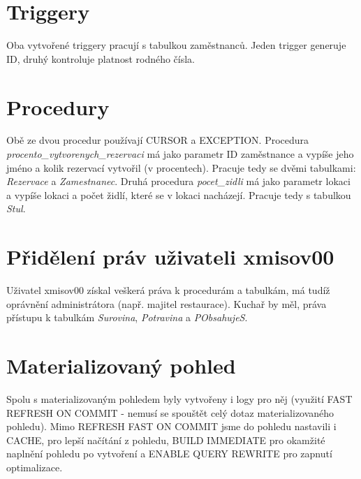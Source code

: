 \documentclass[11pt, a4paper]{article}[]
\begin{document}
    \section{Triggery}
    Oba vytvořené triggery pracují s tabulkou zaměstnanců. Jeden trigger generuje
    ID, druhý kontroluje platnost rodného čísla.

    \section{Procedury}
    Obě ze dvou procedur používají CURSOR a EXCEPTION. Procedura  \textit{procento\_vytvorenych\_rezervaci}
    má jako parametr ID zaměstnance a vypíše jeho jméno a kolik rezervací vytvořil
    (v procentech). Pracuje tedy se dvěmi tabulkami: \textit{Rezervace} a \textit{Zamestnanec}.
    Druhá procedura \textit{pocet\_zidli} má jako parametr lokaci a vypíše
    lokaci a počet židlí, které se v lokaci nacházejí. Pracuje tedy s tabulkou
    \textit{Stul}.

    \section{Přidělení práv uživateli xmisov00}
    Uživatel xmisov00 získal veškerá práva k procedurám a tabulkám, má tudíž
    oprávnění administrátora (např. majitel restaurace). Kuchař by měl, práva
    přístupu k tabulkám \textit{Surovina}, \textit{Potravina} a \textit{PObsahujeS}.

    \section{Materializovaný pohled}
    Spolu s materializovaným pohledem byly vytvořeny i logy pro něj (využití
    FAST REFRESH ON COMMIT - nemusí se spouštět celý dotaz materializovaného
    pohledu). Mimo REFRESH FAST ON COMMIT jsme do pohledu nastavili i CACHE,
    pro lepší načítání z pohledu, BUILD IMMEDIATE pro okamžité naplnění pohledu
    po vytvoření a ENABLE QUERY REWRITE pro zapnutí optimalizace.
\end{document}
